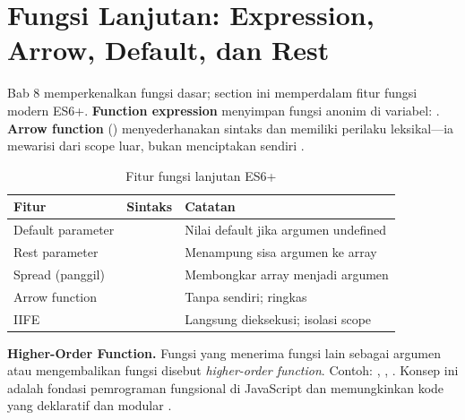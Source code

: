 ﻿\section{Fungsi Lanjutan: Expression, Arrow, Default, dan Rest}

Bab 8 memperkenalkan fungsi dasar; section ini memperdalam fitur fungsi modern ES6+. \textbf{Function expression} menyimpan fungsi anonim di variabel: . \textbf{Arrow function} (\code{=>}) menyederhanakan sintaks dan memiliki perilaku  leksikal---ia mewarisi  dari scope luar, bukan menciptakan  sendiri \cite{jsInfo}.

\begin{table}[H]
\centering
\begin{tabular}{|P{3cm}|P{4.5cm}|P{4.5cm}|}
\hline
\textbf{Fitur} & \textbf{Sintaks} & \textbf{Catatan} \\
\hline
Default parameter &  & Nilai default jika argumen undefined \\
\hline
Rest parameter &  & Menampung sisa argumen ke array \\
\hline
Spread (panggil) &  & Membongkar array menjadi argumen \\
\hline
Arrow function &  & Tanpa  sendiri; ringkas \\
\hline
IIFE &  & Langsung dieksekusi; isolasi scope \\
\hline
\end{tabular}
\caption{Fitur fungsi lanjutan ES6+}
\end{table}

\begin{konsep}
\textbf{Higher-Order Function.} Fungsi yang menerima fungsi lain sebagai argumen atau mengembalikan fungsi disebut \textit{higher-order function}. Contoh: , , . Konsep ini adalah fondasi pemrograman fungsional di JavaScript dan memungkinkan kode yang deklaratif dan modular \cite{eloquentJs}.
\end{konsep}

